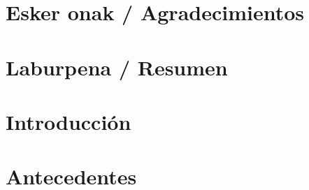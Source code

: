 \documentclass[a4page, 11pt, showtrims]{memoir}
\title{\izenburua}
\author{\egilea}
\date{\data}
\begin{document}
	
%




%
%
%

\cleardoublepage
\frontmatter


\chapter*{Esker onak / Agradecimientos}

\cleardoublepage


\chapter*{Laburpena / Resumen}

\cleardoublepage


\tableofcontents
\clearpage
\listoffigures
\clearpage
\listoftables
\clearpage
\listofalgorithms
{}



\cleardoublepage
\mainmatter
\pagestyle{ruled}

\chapter{Introducción} \label{ch:txantiloia}

\cleardoublepage
\chapter{Antecedentes} \label{ch:plantilla}

\cleardoublepage
\end{document}
